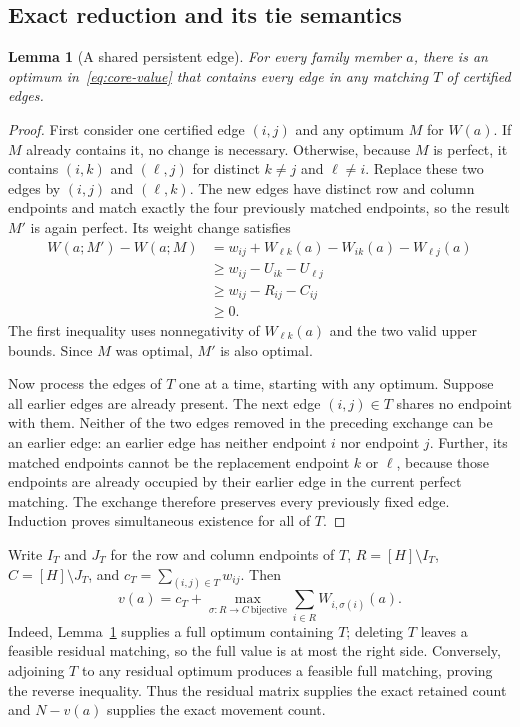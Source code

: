 \documentclass[11pt]{article}
\newtheorem{lemma}{Lemma}
\begin{document}
\subsection{Exact reduction and its tie semantics}
\begin{lemma}[A shared persistent edge]\label{lem:core-persistent}
For every family member $a$, there is an optimum in~\eqref{eq:core-value} that contains every edge in any matching $T$ of certified edges.
\end{lemma}
\begin{proof}
First consider one certified edge $(i,j)$ and any optimum $M$ for $W(a)$. If $M$ already contains it, no change is necessary. Otherwise, because $M$ is perfect, it contains $(i,k)$ and $(\ell,j)$ for distinct $k\ne j$ and $\ell\ne i$. Replace these two edges by $(i,j)$ and $(\ell,k)$. The new edges have distinct row and column endpoints and match exactly the four previously matched endpoints, so the result $M'$ is again perfect. Its weight change satisfies
\begin{align}
W(a;M')-W(a;M)
&=w_{ij}+W_{\ell k}(a)-W_{ik}(a)-W_{\ell j}(a)\nonumber\\
&\ge w_{ij}-U_{ik}-U_{\ell j}\nonumber\\
&\ge w_{ij}-R_{ij}-C_{ij}\nonumber\\
&\ge0.\label{eq:core-exchange}
\end{align}
The first inequality uses nonnegativity of $W_{\ell k}(a)$ and the two valid upper bounds. Since $M$ was optimal, $M'$ is also optimal.

Now process the edges of $T$ one at a time, starting with any optimum. Suppose all earlier edges are already present. The next edge $(i,j)\in T$ shares no endpoint with them. Neither of the two edges removed in the preceding exchange can be an earlier edge: an earlier edge has neither endpoint $i$ nor endpoint $j$. Further, its matched endpoints cannot be the replacement endpoint $k$ or $\ell$, because those endpoints are already occupied by their earlier edge in the current perfect matching. The exchange therefore preserves every previously fixed edge. Induction proves simultaneous existence for all of $T$.
\end{proof}

Write $I_T$ and $J_T$ for the row and column endpoints of $T$, $R=[H]\setminus I_T$, $C=[H]\setminus J_T$, and $c_T=\sum_{(i,j)\in T}w_{ij}$. Then
\begin{equation}\label{eq:core-exact}
v(a)=c_T+\max_{\sigma:R\to C\ \mathrm{bijective}}\sum_{i\in R}W_{i,\sigma(i)}(a).
\end{equation}
Indeed, Lemma~\ref{lem:core-persistent} supplies a full optimum containing $T$; deleting $T$ leaves a feasible residual matching, so the full value is at most the right side. Conversely, adjoining $T$ to any residual optimum produces a feasible full matching, proving the reverse inequality. Thus the residual matrix supplies the exact retained count and $N-v(a)$ supplies the exact movement count.
\end{document}
